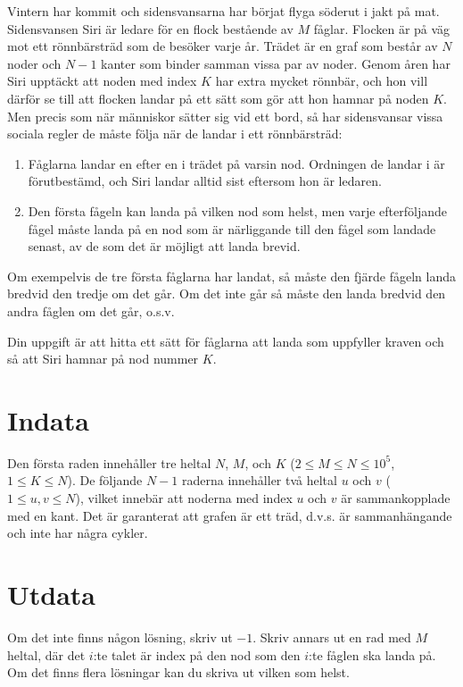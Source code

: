Vintern har kommit och sidensvansarna har börjat flyga söderut i jakt på mat. Sidensvansen Siri är ledare för en 
flock bestående av $M$ fåglar. Flocken är på väg mot ett rönnbärsträd som de besöker varje år. Trädet är en graf som består av $N$ noder
 och $N-1$ kanter som binder samman vissa par av noder. Genom åren har Siri upptäckt att noden med index $K$ har extra 
 mycket rönnbär, och hon vill därför se till att flocken landar på ett sätt som gör att hon hamnar på noden $K$. 
 Men precis som när människor sätter sig vid ett bord, så har sidensvansar vissa sociala regler de måste följa när 
 de landar i ett rönnbärsträd:
 
 \begin{enumerate}
 \item Fåglarna landar en efter en i trädet på varsin nod. Ordningen de landar i är förutbestämd, och Siri landar 
 alltid sist eftersom hon är ledaren.
 \item Den första fågeln kan landa på vilken nod som helst, men varje efterföljande fågel måste landa på en nod som 
 är närliggande till den fågel som landade senast, av de som det är möjligt att landa brevid.
 \end{enumerate}

Om exempelvis de tre första fåglarna har landat, så måste den fjärde fågeln landa bredvid den tredje om det går. Om det 
inte går så måste den landa bredvid den andra fåglen om det går, o.s.v.

Din uppgift är att hitta ett sätt för fåglarna att landa som uppfyller kraven och så att Siri hamnar på nod nummer $K$.

\section*{Indata}
Den första raden innehåller tre heltal $N$, $M$, och $K$ ($2 \leq M \leq N \leq 10^5$, $1 \leq K \leq N$).
De följande $N-1$ raderna innehåller två heltal $u$ och $v$ ($1 \leq u,v \leq N$), vilket innebär att noderna med 
index $u$ och $v$ är sammankopplade med en kant.
Det är garanterat att grafen är ett träd, d.v.s. är sammanhängande och inte har några cykler.

\section*{Utdata}
Om det inte finns någon lösning, skriv ut $-1$. Skriv annars ut en rad med $M$ heltal, där det $i$:te talet 
är index på den nod som den $i$:te fåglen ska landa på. Om det finns flera lösningar kan du skriva ut vilken som 
helst.

